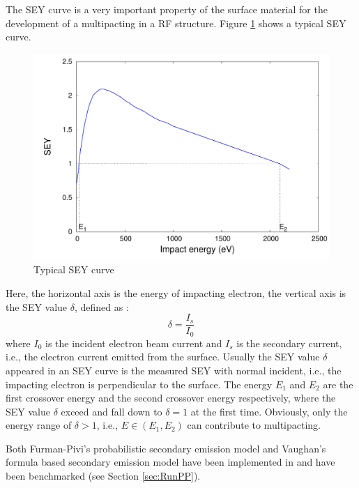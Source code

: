 The SEY curve is a very important property of the surface material for the development of a multipacting in a RF structure. Figure \ref{fig:typicalSEY}  shows a typical SEY curve.
\begin{figure}[ht]
 \begin{center}
 \includegraphics[width=0.8\linewidth,angle=0]{figures/Multipacting/SEY_curve.pdf}
  \caption{Typical SEY curve}
  \label{fig:typicalSEY}
 \end{center}
\end{figure}  
Here, the horizontal axis is the energy of impacting electron, the vertical axis is the SEY value $\delta$, defined as \cite{Furman-Pivi}:
 \begin{equation}
\delta = \frac{I_s}{I_0} \label{eq:SEY}
\end{equation}
where $I_0$ is the incident electron beam current and $I_s$ is the secondary current, i.e., the electron current emitted from the surface. Usually the SEY value $\delta$ appeared in an SEY curve is the measured SEY with normal incident, i.e., the impacting electron is perpendicular to the surface. The energy $E_1$ and $E_2$ are the first crossover energy and the second crossover energy respectively, where the SEY value $\delta$ exceed and fall down to $\delta = 1$ at the first time. Obviously, only the energy range of $\delta>1$, i.e., $E \in (E_1,E_2)$ can contribute to multipacting. 

Both Furman-Pivi's probabilistic secondary emission model \cite{Furman-Pivi} and Vaughan's formula based secondary emission model \cite{Vaughan} have been implemented in \opal and have been benchmarked (see Section \ref{sec:RunPP}).

